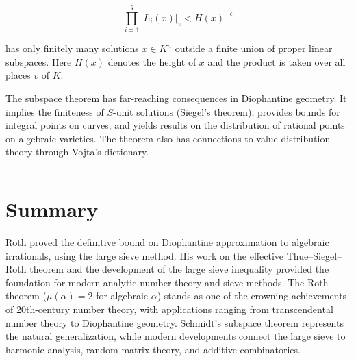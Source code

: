 \[\prod_{i=1}^q |L_i(x)|_v < H(x)^{-\epsilon}\]

has only finitely many solutions $x \in K^n$ outside a finite union of proper
linear subspaces. Here $H(x)$ denotes the height of $x$ and the product is
taken over all places $v$ of $K$.

The subspace theorem has far-reaching consequences in Diophantine geometry. It
implies the finiteness of $S$-unit solutions (Siegel's theorem), provides
bounds for integral points on curves, and yields results on the distribution of
rational points on algebraic varieties. The theorem also has connections to
value distribution theory through Vojta's dictionary.

\begin{center}\rule{0.5\linewidth}{0.5pt}\end{center}

\section*{Summary}

Roth proved the definitive bound on Diophantine approximation to algebraic
irrationals, using the large sieve method. His work on the effective
Thue--Siegel--Roth theorem and the development of the large sieve inequality
provided the foundation for modern analytic number theory and sieve methods.
The Roth theorem ($\mu(\alpha) = 2$ for algebraic $\alpha$) stands as one of
the crowning achievements of 20th-century number theory, with applications
ranging from transcendental number theory to Diophantine geometry. Schmidt's
subspace theorem represents the natural generalization, while modern
developments connect the large sieve to harmonic analysis, random matrix
theory, and additive combinatorics.
